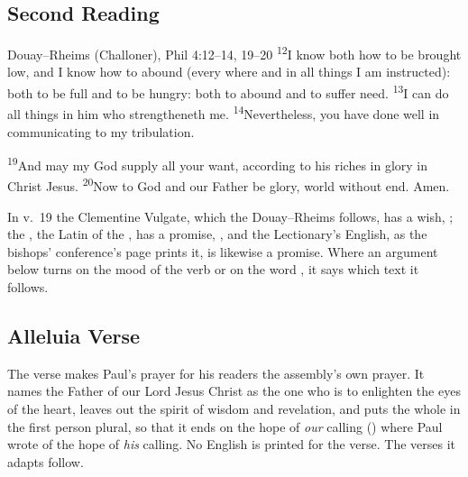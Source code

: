 \subsection{Second Reading}
\label{proper-second-reading}


\begin{englishwitness}{Douay--Rheims (Challoner), Phil 4:12--14, 19--20}
\textsuperscript{12}I know both how to be brought low, and I know how to abound
(every where and in all things I am instructed): both to be full and to be
hungry: both to abound and to suffer need. \textsuperscript{13}I can do all
things in him who strengtheneth me. \textsuperscript{14}Nevertheless, you have
done well in communicating to my tribulation.


\textsuperscript{19}And may my God supply all your want, according to his
riches in glory in Christ Jesus. \textsuperscript{20}Now to God and our Father
be glory, world without end. Amen.
\end{englishwitness}

\noindent In v.~19 the Clementine Vulgate, which the Douay--Rheims follows,
has a wish, ; the ,
the Latin of the , has a promise, , and the
Lectionary's English, as the bishops' conference's page prints it, is likewise
a promise. Where an argument below turns on the mood of the verb or on the
word , it says which text it follows.

\subsection{Alleluia Verse}
\label{proper-gospel-acclamation}


\noindent The verse makes Paul's prayer for his readers the assembly's own
prayer. It names the Father of our Lord Jesus Christ as the one who is to
enlighten the eyes of the heart, leaves out the spirit of wisdom and
revelation, and puts the whole in the first person plural, so that it ends on
the hope of \emph{our} calling () where Paul
wrote of the hope of \emph{his} calling. No English is printed for the verse.
The verses it adapts follow.

